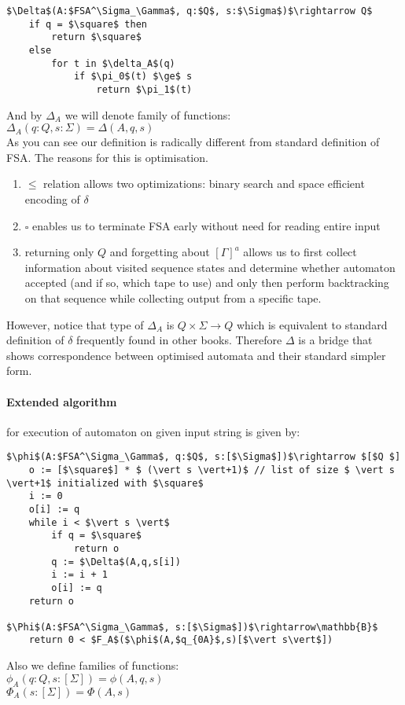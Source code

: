 \documentclass[12pt]{article}
\begin{document}
\begin{lstlisting}
$\Delta$(A:$FSA^\Sigma_\Gamma$, q:$Q$, s:$\Sigma$)$\rightarrow Q$
    if q = $\square$ then
        return $\square$
    else
        for t in $\delta_A$(q)
            if $\pi_0$(t) $\ge$ s
                return $\pi_1$(t)
\end{lstlisting}
And by $\Delta_A$ we will denote family of functions:\\
$\Delta_A(q:Q, s:\Sigma) = \Delta(A,q,s)$  \\
As you can see our definition is radically different from standard definition of FSA. The reasons for this is optimisation. 
\begin{enumerate}
	\item $\le$ relation allows two optimizations: binary search and space efficient encoding of $\delta$
	\item $\square$ enables us to terminate FSA early without need for reading entire input
	\item returning only $Q$ and forgetting about $[\Gamma]^a$ allows us to first collect information about visited sequence states and determine whether automaton accepted (and if so, which tape to use) and only then perform backtracking on that sequence while collecting output from a specific tape.
\end{enumerate}
However, notice that type of $\Delta_A$ is $ Q \times \Sigma \rightarrow Q$ which is equivalent to standard definition of $\delta$ frequently found in other books. Therefore $\Delta$ is a bridge that shows correspondence between optimised automata and their standard simpler form. 



\paragraph{Extended algorithm } for execution of automaton on given input string is given by:
\begin{lstlisting}
$\phi$(A:$FSA^\Sigma_\Gamma$, q:$Q$, s:[$\Sigma$])$\rightarrow $[$Q $]
    o := [$\square$] * $ (\vert s \vert+1)$ // list of size $ \vert s \vert+1$ initialized with $\square$
    i := 0
    o[i] := q
    while i < $\vert s \vert$
        if q = $\square$
            return o
        q := $\Delta$(A,q,s[i])	 
        i := i + 1
        o[i] := q
    return o

$\Phi$(A:$FSA^\Sigma_\Gamma$, s:[$\Sigma$])$\rightarrow\mathbb{B}$
    return 0 < $F_A$($\phi$(A,$q_{0A}$,s)[$\vert s\vert$])
\end{lstlisting}
Also we define families of functions: \\
$\phi_A(q:Q, s:[\Sigma]) = \phi(A,q,s)$ \\
$\Phi_A(s:[\Sigma]) = \Phi(A,s)$ \\
\end{document}
